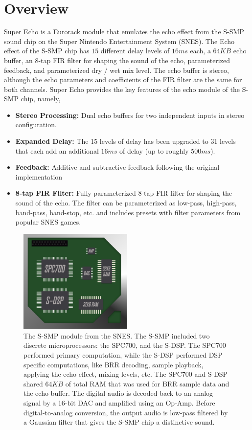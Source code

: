 \documentclass[12pt,letter]{article}
\begin{document}


\section{Overview}

Super Echo is a Eurorack module that emulates the echo effect from the S-SMP sound chip on the Super Nintendo Entertainment System (SNES). The Echo effect of the S-SMP chip has $15$ different delay levels of $16ms$ each, a $64KB$ echo buffer, an 8-tap FIR filter for shaping the sound of the echo, parameterized feedback, and parameterized dry / wet mix level. The echo buffer is stereo, although the echo parameters and coefficients of the FIR filter are the same for both channels. Super Echo provides the key features of the echo module of the S-SMP chip, namely,
\begin{itemize}
  \item \textbf{Stereo Processing:} Dual echo buffers for two independent inputs in stereo configuration.
  \item \textbf{Expanded Delay:} The 15 levels of delay has been upgraded to 31 levels that each add an additional $16ms$ of delay (up to roughly $500ms$).
  \item \textbf{Feedback:} Additive and subtractive feedback following the original implementation
  \item \textbf{8-tap FIR Filter:} Fully parameterized 8-tap FIR filter for shaping the sound of the echo. The filter can be parameterized as low-pass, high-pass, band-pass, band-stop, etc. and includes presets with filter parameters from popular SNES games.
\end{itemize}

\begin{figure}[!b]
\centering
\includegraphics[width=0.5\textwidth]{img/Chip}
\caption*{\small The S-SMP module from the SNES. The S-SMP included two discrete microprocessors: the SPC700, and the S-DSP. The SPC700 performed primary computation, while the S-DSP performed DSP specific computations, like BRR decoding, sample playback, applying the echo effect, mixing levels, etc. The SPC700 and S-DSP shared $64KB$ of total RAM that was used for BRR sample data and the echo buffer. The digital audio is decoded back to an analog signal by a 16-bit DAC and amplified using an Op-Amp. Before digital-to-analog conversion, the output audio is low-pass filtered by a Gaussian filter that gives the S-SMP chip a distinctive sound.}
\end{figure}
\end{document}
